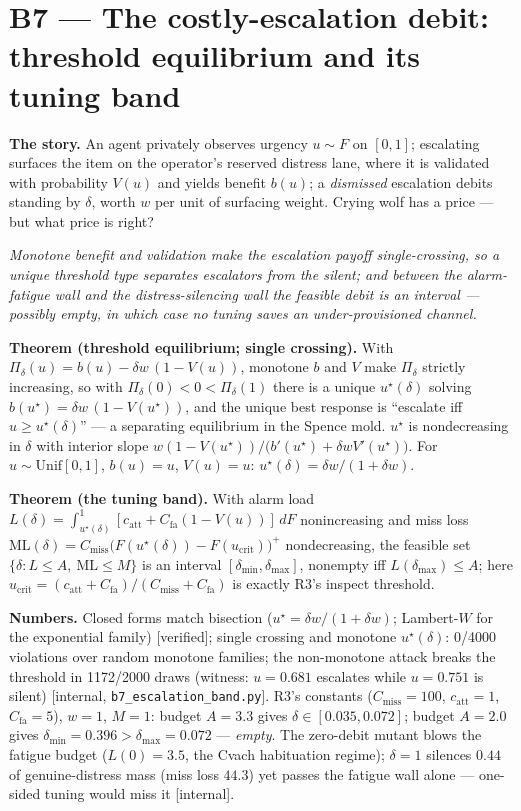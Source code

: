 \documentclass[11pt,a4paper]{article}
\newcommand{\onebreath}[1]{\begin{center}\emph{#1}\end{center}}
\begin{document}
\section{B7 --- The costly-escalation debit: threshold equilibrium and its tuning band}\label{sec:b7}
\textbf{The story.} An agent privately observes urgency $u \sim F$ on $[0,1]$; escalating surfaces the item on the operator's reserved distress lane, where it is validated with probability $V(u)$ and yields benefit $b(u)$; a \emph{dismissed} escalation debits standing by $\delta$, worth $w$ per unit of surfacing weight. Crying wolf has a price --- but what price is right?

\onebreath{Monotone benefit and validation make the escalation payoff single-crossing, so a unique threshold type separates escalators from the silent; and between the alarm-fatigue wall and the distress-silencing wall the feasible debit is an interval --- possibly empty, in which case no tuning saves an under-provisioned channel.}

\begin{thebox}
\textbf{Theorem (threshold equilibrium; single crossing).} With $\Pi_\delta(u) = b(u) - \delta w\,(1 - V(u))$, monotone $b$ and $V$ make $\Pi_\delta$ strictly increasing, so with $\Pi_\delta(0)<0<\Pi_\delta(1)$ there is a unique $u^\star(\delta)$ solving $b(u^\star) = \delta w\,(1 - V(u^\star))$, and the unique best response is ``escalate iff $u \ge u^\star(\delta)$'' --- a separating equilibrium in the Spence mold. $u^\star$ is nondecreasing in $\delta$ with interior slope $w(1-V(u^\star))/\bigl(b'(u^\star) + \delta w V'(u^\star)\bigr)$. For $u \sim \mathrm{Unif}[0,1]$, $b(u)=u$, $V(u)=u$: $u^\star(\delta) = \delta w/(1+\delta w)$.

\textbf{Theorem (the tuning band).} With alarm load $L(\delta) = \int_{u^\star(\delta)}^{1} [c_{\mathrm{att}} + C_{\mathrm{fa}}(1-V(u))]\,dF$ nonincreasing and miss loss $\mathrm{ML}(\delta) = C_{\mathrm{miss}}\bigl(F(u^\star(\delta)) - F(u_{\mathrm{crit}})\bigr)^{\!+}$ nondecreasing, the feasible set $\{\delta : L \le A,\ \mathrm{ML} \le M\}$ is an interval $[\delta_{\min}, \delta_{\max}]$, nonempty iff $L(\delta_{\max}) \le A$; here $u_{\mathrm{crit}} = (c_{\mathrm{att}}+C_{\mathrm{fa}})/(C_{\mathrm{miss}}+C_{\mathrm{fa}})$ is exactly R3's inspect threshold.
\end{thebox}

\textbf{Numbers.} Closed forms match bisection ($u^\star = \delta w/(1+\delta w)$; Lambert-$W$ for the exponential family) [verified]; single crossing and monotone $u^\star(\delta)$: 0/4000 violations over random monotone families; the non-monotone attack breaks the threshold in 1172/2000 draws (witness: $u=0.681$ escalates while $u=0.751$ is silent) [internal, \texttt{b7\_escalation\_band.py}]. R3's constants ($C_{\mathrm{miss}}{=}100$, $c_{\mathrm{att}}{=}1$, $C_{\mathrm{fa}}{=}5$), $w{=}1$, $M{=}1$: budget $A=3.3$ gives $\delta \in [0.035, 0.072]$; budget $A=2.0$ gives $\delta_{\min}=0.396 > \delta_{\max}=0.072$ --- \emph{empty}. The zero-debit mutant blows the fatigue budget ($L(0)=3.5$, the Cvach habituation regime); $\delta=1$ silences $0.44$ of genuine-distress mass (miss loss $44.3$) yet passes the fatigue wall alone --- one-sided tuning would miss it [internal].
\end{document}
